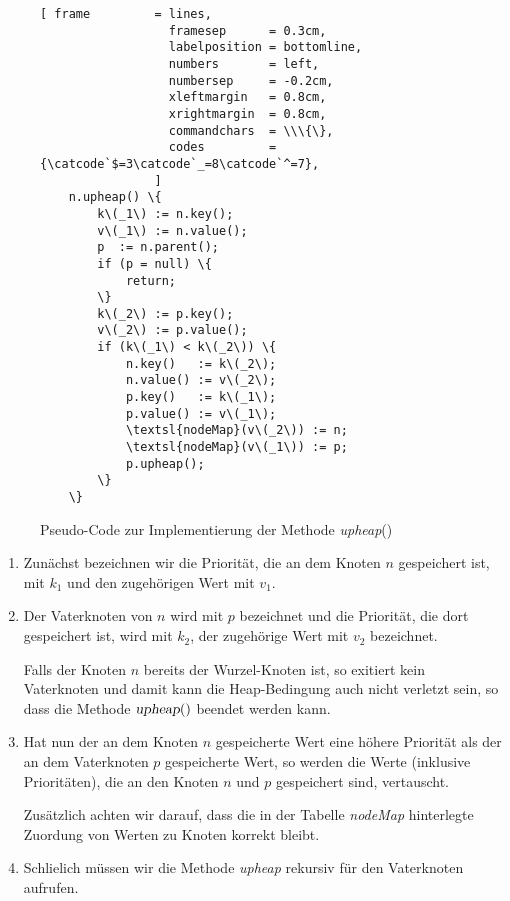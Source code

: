 \begin{figure}[!ht]
\centering
\begin{Verbatim}[ frame         = lines, 
                  framesep      = 0.3cm, 
                  labelposition = bottomline,
                  numbers       = left,
                  numbersep     = -0.2cm,
                  xleftmargin   = 0.8cm,
                  xrightmargin  = 0.8cm,
                  commandchars  = \\\{\},
                  codes         = {\catcode`$=3\catcode`_=8\catcode`^=7},
                ]
    n.upheap() \{
        k\(_1\) := n.key();
        v\(_1\) := n.value();
        p  := n.parent();
        if (p = null) \{ 
            return;
        \}
        k\(_2\) := p.key();
        v\(_2\) := p.value();
        if (k\(_1\) < k\(_2\)) \{
            n.key()   := k\(_2\);
            n.value() := v\(_2\);
            p.key()   := k\(_1\);
            p.value() := v\(_1\);
            \textsl{nodeMap}(v\(_2\)) := n;
            \textsl{nodeMap}(v\(_1\)) := p;
            p.upheap();
        \}
    \}
\end{Verbatim}
\vspace*{-0.3cm}
\caption{Pseudo-Code zur Implementierung der Methode \textsl{upheap}()}
\label{fig:upheap.pseudo}
\end{figure}%

\begin{enumerate}
\item Zun\"achst bezeichnen wir die Priorit\"at, die an dem Knoten $n$ gespeichert ist,
      mit $k_1$ und den zugeh\"origen Wert mit $v_1$.
\item Der Vaterknoten von $n$ wird mit $p$ bezeichnet und die Priorit\"at, die dort gespeichert ist,
      wird mit $k_2$, der zugeh\"orige Wert mit $v_2$ bezeichnet.  

      Falls der Knoten $n$
      bereits der Wurzel-Knoten ist, so exitiert kein  Vaterknoten und damit kann die
      Heap-Bedingung auch nicht verletzt sein, so dass die Methode $\textsl{upheap}()$
      beendet werden kann.
\item Hat nun der an dem Knoten $n$ gespeicherte Wert eine h\"ohere Priorit\"at als der an dem
      Vaterknoten $p$ gespeicherte Wert, so werden die Werte (inklusive Priorit\"aten), die
      an den Knoten $n$ und $p$ gespeichert sind, vertauscht.  

      Zus\"atzlich achten wir darauf, dass die in der Tabelle \textsl{nodeMap} hinterlegte
      Zuordung von Werten zu Knoten korrekt bleibt.
\item Schlie\3lich m\"ussen wir die Methode \textsl{upheap} rekursiv f\"ur den Vaterknoten aufrufen.
\end{enumerate}


